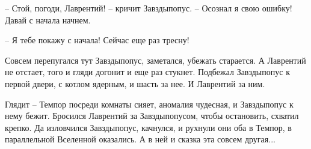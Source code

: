 \documentclass[ebook,oneside,final,openright]{memoir}
\begin{document}
\par
– Стой, погоди, Лаврентий! – кричит Завздыпопус. – Осознал я свою ошибку! Давай с начала начнем.\par
– Я тебе покажу с начала! Сейчас еще раз тресну!\par
\par
Совсем перепугался тут Завздыпопус, заметался, убежать старается. А Лаврентий не отстает, того и гляди догонит и еще раз стукнет. Подбежал Завздыпопус к первой двери, с котлом ядерным, и шасть за нее. И Лаврентий за ним.\par
\par
Глядит – Темпор посреди комнаты сияет, аномалия чудесная, и Завздыпопус к нему бежит. Бросился Лаврентий за Завздыпопусом, чтобы остановить, схватил крепко. Да изловчился Завздыпопус, качнулся, и рухнули они оба в Темпор, в параллельной Вселенной оказались. А в ней и сказка эта совсем другая...\par
\end{document}
